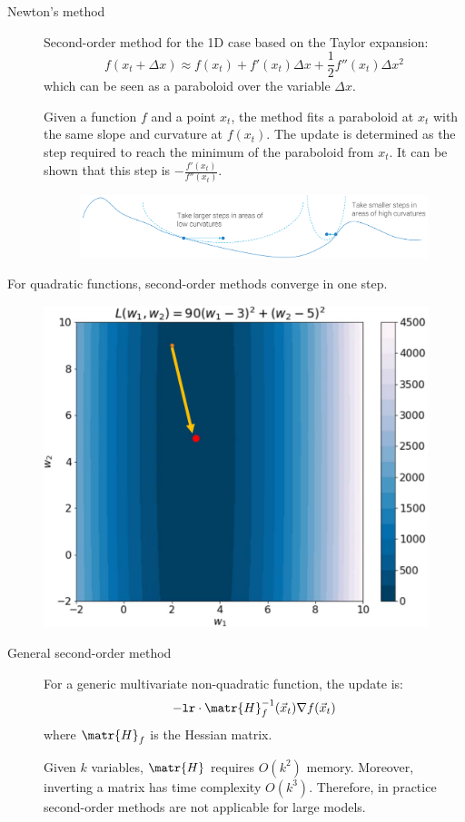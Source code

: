 \begin{description}
    \item[Newton's method] 
        Second-order method for the 1D case based on the Taylor expansion:
        \[ f(x_t + \Delta x) \approx f(x_t) + f'(x_t)\Delta x + \frac{1}{2}f''(x_t)\Delta x^2 \]
        which can be seen as a paraboloid over the variable $\Delta x$.

        Given a function $f$ and a point $x_t$, the method fits a paraboloid at $x_t$ with the same slope and curvature at $f(x_t)$. The update is determined as the step required to reach the minimum of the paraboloid from $x_t$. It can be shown that this step is $-\frac{f'(x_t)}{f''(x_t)}$.

        \begin{figure}[H]
            \centering
            \includegraphics[width=0.7\linewidth]{./img/_2order_optimizer.pdf}
        \end{figure}
\end{description}

\begin{remark}
    For quadratic functions, second-order methods converge in one step.
    \begin{figure}[H]
        \centering
        \includegraphics[width=0.35\linewidth]{./img/2order_1step.png}
    \end{figure}
\end{remark}

\begin{description}
    \item[General second-order method] 
        For a generic multivariate non-quadratic function, the update is:
        \[ -\texttt{lr} \cdot \matr{H}_f^{-1}(\vec{x}_t) \nabla f(\vec{x}_t) \]
        where $\matr{H}_f$ is the Hessian matrix.

        \begin{remark}
            Given $k$ variables, $\matr{H}$ requires $O(k^2)$ memory. Moreover, inverting a matrix has time complexity $O(k^3)$. Therefore, in practice second-order methods are not applicable for large models.
        \end{remark}
\end{description}



